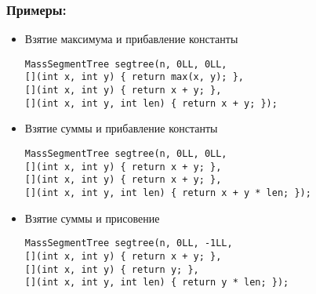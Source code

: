 \subsubsection{Примеры:}
\begin{itemize}
    \item Взятие максимума и прибавление константы
\begin{lstlisting}
MassSegmentTree segtree(n, 0LL, 0LL,
[](int x, int y) { return max(x, y); },
[](int x, int y) { return x + y; },
[](int x, int y, int len) { return x + y; });
\end{lstlisting}

    \item Взятие суммы и прибавление константы
\begin{lstlisting}
MassSegmentTree segtree(n, 0LL, 0LL,
[](int x, int y) { return x + y; },
[](int x, int y) { return x + y; },
[](int x, int y, int len) { return x + y * len; });
\end{lstlisting}

\item Взятие суммы и присовение
\begin{lstlisting}
MassSegmentTree segtree(n, 0LL, -1LL,
[](int x, int y) { return x + y; },
[](int x, int y) { return y; },
[](int x, int y, int len) { return y * len; });
\end{lstlisting}
\end{itemize}